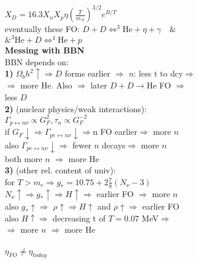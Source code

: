 \documentclass[12pt]{article}
\begin{document}
{	\\$X_D=16.3X_nX_p\eta\left(\frac{T}{m_N}\right)^{3/2}e^{B/T}$
	\\eventually these FO: $D+D\Leftrightarrow ^3\text{He} + \eta + \gamma \quad \&$
	\\$\& ^3\text{He} + D \Leftrightarrow ^4\text{He}+p$
	\\\textbf{Messing with BBN}
	\\BBN depends on:
	\\\textbf{1)} $\Omega_bh^2 \uparrow \Rightarrow D$ forms earlier $\Rightarrow$ $n$: less t to dcy$\Rightarrow$
	\\$\Rightarrow$ more He. Also $\Rightarrow$ later $D+D\rightarrow \text{He}$ FO $\Rightarrow$
	\\less $D$
	\\\textbf{2)} (nuclear physics/weak interactions):
	\\$\Gamma_{p\leftrightarrow n\nu}\propto G^2_F, \tau_n\propto G^{-2}_F$
	\\if $G_F\downarrow \Rightarrow \Gamma_{pe\leftrightarrow n\nu}\downarrow\Rightarrow$n FO earlier$\Rightarrow$ more $n$
	\\also $\Gamma_{pe\leftrightarrow n\nu}\downarrow\Rightarrow$ fewer $n$ decays$\Rightarrow$ more $n$
	\\both more $n$ $\Rightarrow$ more He
	\\\textbf{3)} (other rel. content of univ):
	\\for $T>m_e \Rightarrow g_*=10.75 + 2\frac{7}{8}(N_\nu-3)$
	\\$N_\nu \uparrow \Rightarrow g_*\uparrow \Rightarrow H\uparrow \Rightarrow$ earlier FO $\Rightarrow$ more $n$
	\\also $g_*\uparrow \Rightarrow$ $\rho\uparrow\Rightarrow H\uparrow$ and $\rho\uparrow\Rightarrow$ earlier FO 
	\\also $H\uparrow\Rightarrow$ decreasing t of $T=0.07$ MeV$\Rightarrow$
	\\$\Rightarrow$ more $n$ $\Rightarrow$ more He
	\\
	\\$\eta_{FO}\neq\eta_{today}$

}
\end{document}
